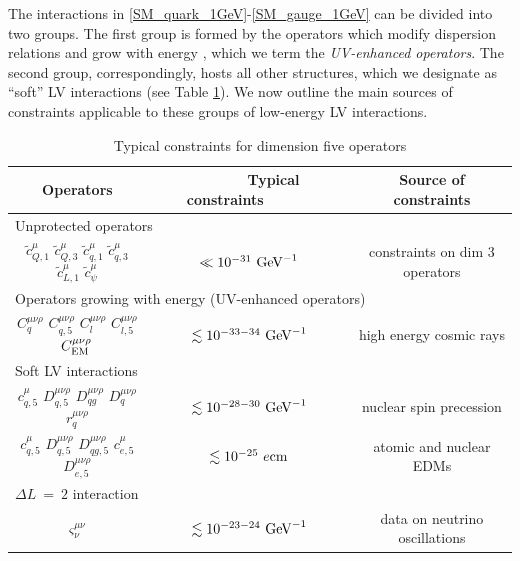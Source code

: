 \documentclass[12pt,preprintnumbers,nofootinbib]{revtex4}
\newcommand{\wt}{\widetilde}
\newcommand{\el}{{\rm EM}}
\newcommand{\GeV}{{\rm GeV}}
\begin{document}
	The interactions in \eqref{SM_quark_1GeV}-\eqref{SM_gauge_1GeV} 
	can be divided into two groups.
	The first group is formed by the operators which modify dispersion relations
	and grow with energy \cite{MP:}, which we term the {\it UV-enhanced operators}.
	The second group, correspondingly, hosts all other
	structures, which we designate as ``soft'' LV interactions  
	(see Table \ref{constr_table}).
	We now outline the main sources of constraints applicable to these groups of 
	low-energy LV interactions.

\begin{table}[tb]
\label{constr_table}
\caption{Typical constraints for dimension five operators}
\begin{tabular}{|ccc|}
\hline
	\multicolumn{1}{|c|}{Operators} & 
	\multicolumn{1}{|c|}{~~~~~~Typical constraints~~~~~~} & 
	\multicolumn{1}{|c|}{Source of constraints} \\
\hline
	\multicolumn{3}{|l|}{\quad Unprotected operators} \\
\hline
	$ \wt{c}_{Q,1}^\mu  $
	$ \wt{c}_{Q,3}^\mu  $
	$ \wt{c}_{q,1}^\mu  $
	$ \wt{c}_{q,3}^\mu  $
	$ \wt{c}_{L,1}^\mu  $
	$ \wt{c}_{\psi}^\mu $  &
	$ \ll 10^{-31}~{\rm GeV}^{-1} $ &
	constraints on dim 3 operators
	\\
\hline
	\multicolumn{3}{|l|}{\quad Operators growing with energy (UV-enhanced operators)} \\
\hline
	$ C_{q}^{\mu\nu\rho} $ $ C_{q,5}^{\mu\nu\rho} $
	$ C_l^{\mu\nu\rho} $  $ C_{l,5}^{\mu\nu\rho} $
	$ C^{\mu\nu\rho}_\el $ &
	$ \lesssim 10^{-33-34}~{\rm GeV}^{-1} $
	&
	high energy cosmic rays
	\\
\hline
	\multicolumn{3}{|l|}{\quad Soft LV interactions} \\
\hline
	$ c^\mu_{q,5} $ $ D^{\mu\nu\rho}_{q,5} $
	$ D_{qg}^{\mu\nu\rho} $  $ D_q^{\mu\nu\rho} $  $ r_q^{\mu\nu\rho} $ &
	$ \lesssim 10^{-28-30}~{\rm GeV}^{-1} $     &
	nuclear spin precession \\
\hline
	$ c^\mu_{q,5} $ $ D^{\mu\nu\rho}_{q,5} $ 
	$ D^{\mu\nu\rho}_{qg,5} $ 
	$ c^\mu_{e,5} $ $ D^{\mu\nu\rho}_{e,5} $ &
	$ \lesssim 10^{-25}~e{\rm cm} $          &
	atomic and nuclear EDMs \\
\hline
	\multicolumn{3}{|l|}{\quad $ \Delta L ~=~ 2 $ interaction} \\
\hline
	$ \varsigma_\nu^{\mu\nu} $          &
	$ \lesssim 10^{-23-24}~\GeV^{-1} $       &
	data on neutrino oscillations \\
\hline
\end{tabular}
\end{table}
	
\end{document}

